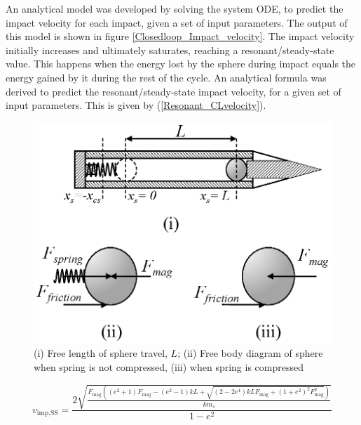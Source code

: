 \documentclass[letterpaper, 10 pt, conference]{ieeeconf}  %
\begin{document}
An analytical model was developed by solving the system ODE, to predict the impact velocity for each impact, given a set of input parameters. The output of this model is shown in figure \ref{Closedloop_Impact_velocity}.
The impact velocity initially increases and ultimately saturates, reaching a resonant/steady-state value. This happens when the energy lost by the sphere during impact equals the energy gained by it during the rest of the cycle. An analytical formula was derived to predict the resonant/steady-state impact velocity, for a given set of input parameters. This is given by (\ref{Resonant_CLvelocity}).
\begin{figure}
	\includegraphics[width=\linewidth]{FBD.eps}
	\caption{(i) Free length of sphere travel, $L$; (ii) Free body diagram of sphere when spring is not compressed, (iii) when spring is compressed}
	\label{FBD}
\end{figure}

 

\begin{equation}
v_{\text{imp},\text{SS}}=\frac{2 \sqrt{\frac{F_{\text{mag}} \left(\left(e^2+1\right) F_{\text{mag}}-\left(e^2-1\right) k L+\sqrt{\left(2-2 e^4\right) k L F_{\text{mag}}+\left(1+e^2\right)^2 F_{\text{mag}}^2}\right)}{k m_s}}}{1-e^2}
\end{equation}
\end{document}

